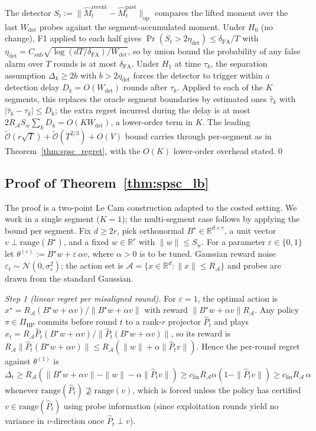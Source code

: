 \documentclass{article}
\newcommand{\R}{\mathbb{R}}
\newcommand{\op}{\mathrm{op}}
\newcommand{\cA}{\mathcal{A}}
\newcommand{\tilO}{\widetilde{\mathcal{O}}}
\newcommand{\range}{\mathrm{range}}
\begin{document}
The detector $S_t := \|\widehat M_t^{\mathrm{recent}} - \widehat M_t^{\mathrm{past}}\|_\op$
compares the lifted moment over the last $W_{\mathrm{det}}$ probes
against the segment-accumulated moment. Under $H_0$ (no change), F1
applied to each half gives
$\Pr(S_t > 2\eta_{\mathrm{det}}) \le \delta_{\mathrm{FA}}/T$ with
$\eta_{\mathrm{det}} = C_{\mathrm{sub}}\sqrt{\log(dT/\delta_{\mathrm{FA}})/W_{\mathrm{det}}}$,
so by union bound the probability of any false alarm over $T$ rounds
is at most $\delta_{\mathrm{FA}}$. Under $H_1$ at time $\tau_k$, the
separation assumption $\Delta_k \ge 2b$ with $b > 2\eta_{\mathrm{det}}$
forces the detector to trigger within a detection delay
$D_k = O(W_{\mathrm{det}})$ rounds after $\tau_k$. Applied to each of
the $K$ segments, this replaces the oracle segment boundaries by
estimated ones $\widehat\tau_k$ with $|\widehat\tau_k - \tau_k| \le D_k$;
the extra regret incurred during the delay is at most
$2 R_\cA S_w \sum_k D_k = O(KW_{\mathrm{det}})$, a lower-order term in
$K$. The leading $\tilO(r\sqrt T) + \tilO(T^{2/3}) + O(V)$ bound carries
through per-segment as in Theorem~\ref{thm:spsc_regret}, with the
$O(K)$ lower-order overhead stated.\qed

\subsection{Proof of Theorem~\ref{thm:spsc_lb}}
\label{app:proof_lb}

The proof is a two-point Le Cam construction adapted to the costed
setting. We work in a single segment ($K=1$); the multi-segment case
follows by applying the bound per segment. Fix $d\ge 2r$, pick
orthonormal $B^\star\in\R^{d\times r}$, a unit vector
$v\perp\range(B^\star)$, and a fixed $w\in\R^r$ with $\|w\|\le S_w$.
For a parameter $\varepsilon\in\{0,1\}$ let
$\theta^{(\varepsilon)} := B^\star w + \varepsilon\,\alpha v$, where
$\alpha>0$ is to be tuned. Gaussian reward noise
$\varepsilon_t\sim\mathcal N(0,\sigma_\varepsilon^2)$; the action set
is $\cA = \{x\in\R^d : \|x\|\le R_\cA\}$ and probes are drawn from
the standard Gaussian.

\emph{Step 1 (linear regret per misaligned round).}
For $\varepsilon=1$, the optimal action is
$x^\star = R_\cA(B^\star w + \alpha v)/\|B^\star w + \alpha v\|$
with reward $\|B^\star w + \alpha v\|R_\cA$. Any policy
$\pi\in\Pi_{\mathrm{HP}}$ commits before round $t$ to a rank-$r$
projector $\widehat P_t$ and plays
$x_t = R_\cA \widehat P_t(B^\star w + \alpha v)/\|\widehat P_t(B^\star w + \alpha v)\|$,
so its reward is
$R_\cA \|\widehat P_t(B^\star w + \alpha v)\|
\le R_\cA(\|w\| + \alpha\|\widehat P_t v\|)$.
Hence the per-round regret against $\theta^{(1)}$ is
\[
\Delta_t \ge R_\cA(\|B^\star w+\alpha v\| - \|w\|
- \alpha\|\widehat P_t v\|)
\ge c_{\mathrm{lin}} R_\cA \alpha (1-\|\widehat P_t v\|)
\ge c_{\mathrm{lin}} R_\cA\,\alpha
\]
whenever $\range(\widehat P_t)\not\supseteq\range(v)$, which is
forced unless the policy has certified $v\in\range(\widehat P_t)$
using probe information (since exploitation rounds yield no variance
in $v$-direction once $\widehat P_t\perp v$).
\end{document}
